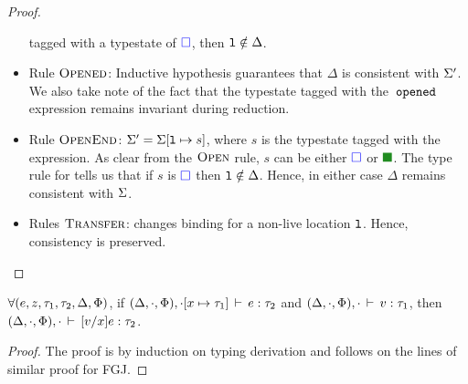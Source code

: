 \begin{proof}
\begin{itemize}
  tagged with a typestate of ${\color{blue} \square}$, then $\mathtt{l}\notin \Delta$.
  \item Rule $\textrm{\sc {Opened}}$: Inductive hypothesis guarantees
  that $\Delta$ is consistent with $\Sigma'$.
  We also take note of the fact that the typestate tagged with the
  $\,{\tt opened}\,$ expression remains invariant during reduction.
  \item Rule $\textrm{\sc {OpenEnd}}$: $\Sigma'=\Sigma[\mathtt{l}\mapsto s]$, where
  $s$ is the typestate tagged with the  expression. As clear
  from the $\textrm{\sc {Open}}$ rule, $s$ can be either ${\color{blue} \square}$ or
  $\LIVE$. The type rule for  tells us that if $s$ is
  ${\color{blue} \square}$ then $\mathtt{l}\notin\Delta$. Hence, in either case $\Delta$
  remains consistent with $\Sigma$.
  \item Rules $\textrm{\sc {Transfer}}$: changes binding for a non-live
  location $\mathtt{l}$. Hence, consistency is preserved.
\end{itemize} 
\end{proof}

\begin{lemma}
\label{lem:substitution}
$\forall(e,z,\tau_1,\tau_2,\Delta,\Phi)$, if $(\Delta,\cdot,
\Phi),\cdot[x\mapsto\tau_1]\,\vdash\,e:\tau_2$ and $(\Delta,\cdot,
\Phi),\cdot\,\vdash\,v:\tau_1$, then $(\Delta,\cdot,
\Phi),\cdot\,\vdash\,[v/x]e:\tau_2$.
\end{lemma}
\begin{proof}
The proof is by induction on typing derivation and follows on the
lines of similar proof for FGJ.
\end{proof}

